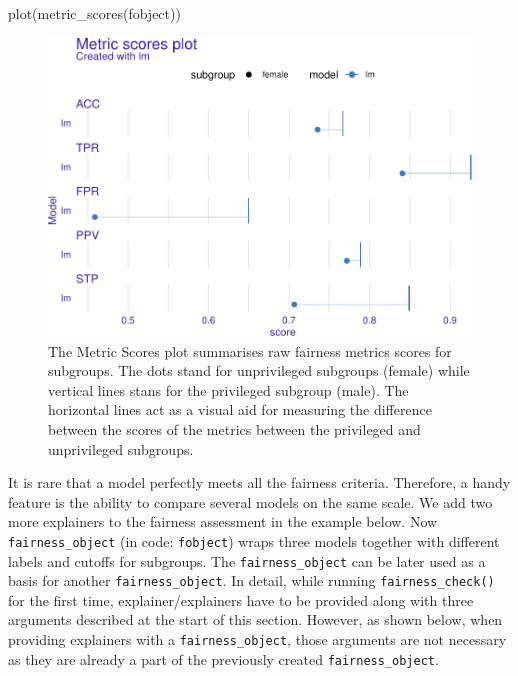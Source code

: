 \begin{Schunk}
\begin{Sinput}
plot(metric_scores(fobject))
\end{Sinput}
\begin{figure}

{\centering \includegraphics[width=0.75\linewidth]{Wisniewski-Biecek_files/figure-latex/fairness-plot-2-1} 

}

\caption[The Metric Scores plot summarises raw fairness metrics scores for subgroups]{The Metric Scores plot summarises raw fairness metrics scores for subgroups. The dots stand for unprivileged subgroups (female) while vertical lines stans for the privileged subgroup (male). The horizontal lines act as a visual aid for measuring the difference between the scores of the metrics between the privileged and unprivileged subgroups.}\label{fig:fairness-plot-2}
\end{figure}
\end{Schunk}

It is rare that a model perfectly meets all the fairness criteria.
Therefore, a handy feature is the ability to compare several models on
the same scale. We add two more explainers to the fairness assessment in
the example below. Now \texttt{fairness\_object} (in code:
\texttt{fobject}) wraps three models together with different labels and
cutoffs for subgroups. The \texttt{fairness\_object} can be later used
as a basis for another \texttt{fairness\_object}. In detail, while
running \texttt{fairness\_check()} for the first time,
explainer/explainers have to be provided along with three arguments
described at the start of this section. However, as shown below, when
providing explainers with a \texttt{fairness\_object}, those arguments
are not necessary as they are already a part of the previously created
\texttt{fairness\_object}.

